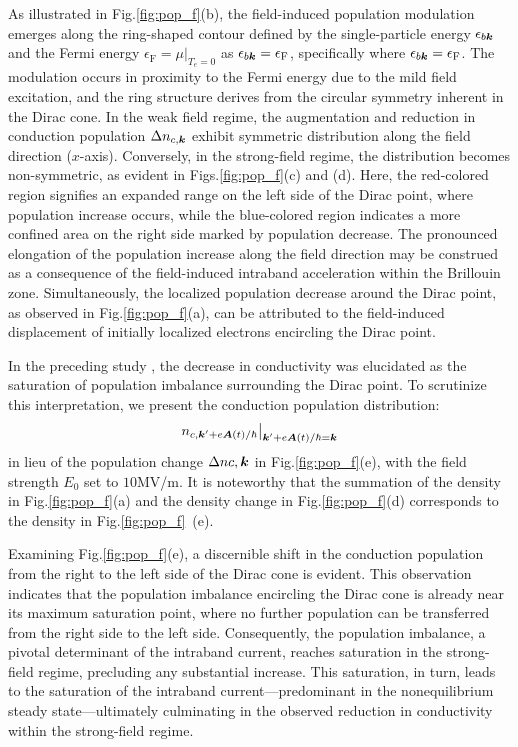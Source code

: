 As illustrated in Fig.\ref{fig:pop_f}(b), the field-induced population modulation emerges along the
ring-shaped contour defined by the single-particle energy $\epsilon_{b\boldsymbol k}$ and the Fermi
energy $\epsilon_{\mathrm F}=\mu\big |_{T_e=0}$ as $\epsilon_{b\boldsymbol k}=\epsilon_{\mathrm F}$,
specifically where $\epsilon_{b \boldsymbol k}=\epsilon_{\mathrm F}$. The modulation occurs in proximity to the Fermi energy due to the mild field excitation, and the ring structure derives from the circular symmetry inherent in the Dirac cone. In the weak field regime, the augmentation and reduction in conduction population $\Delta n_{c,\boldsymbol{k}}$ exhibit symmetric distribution along the field direction ($x$-axis). Conversely, in the strong-field regime, the distribution becomes non-symmetric, as evident in Figs.\ref{fig:pop_f}(c) and (d). Here, the red-colored region signifies an expanded range on the left side of the Dirac point, where population increase occurs, while the blue-colored region indicates a more confined area on the right side marked by population decrease. The pronounced elongation of the population increase along the field direction may be construed as a consequence of the field-induced intraband acceleration within the Brillouin zone. Simultaneously, the localized population decrease around the Dirac point, as observed in Fig.\ref{fig:pop_f}(a), can be attributed to the field-induced displacement of initially localized electrons encircling the Dirac point.

In the preceding study \cite{sato2021nonlinear}, the decrease in conductivity was elucidated as the
saturation of population imbalance surrounding the Dirac point. To scrutinize this interpretation,
we present the conduction population distribution:
\begin{align}
n_{c,\boldsymbol k'+e\boldsymbol A(t)/\hbar}\big |_{\boldsymbol k'+e\boldsymbol A(t)/\hbar=\boldsymbol k}
    \end{align}
in lieu of the population change $\Delta n{c,\boldsymbol{k}}$ in Fig.\ref{fig:pop_f}(e), with the field strength $E_0$ set to $10$MV/m. It is noteworthy that the summation of the density in Fig.\ref{fig:pop_f}(a) and the density change in Fig.\ref{fig:pop_f}(d) corresponds to the density in Fig.\ref{fig:pop_f}~(e).

Examining Fig.\ref{fig:pop_f}(e), a discernible shift in the conduction population from the right to the left side of the Dirac cone is evident. This observation indicates that the population imbalance encircling the Dirac cone is already near its maximum saturation point, where no further population can be transferred from the right side to the left side. Consequently, the population imbalance, a pivotal determinant of the intraband current, reaches saturation in the strong-field regime, precluding any substantial increase. This saturation, in turn, leads to the saturation of the intraband current—predominant in the nonequilibrium steady state—ultimately culminating in the observed reduction in conductivity within the strong-field regime.

